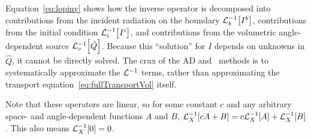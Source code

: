 Equation~\eqref{eq:lopinv} shows how the inverse operator is decomposed into
contributions from the incident radiation on the boundary
$\mathcal{L}_{b}^{-1}\!\left[I^b\right]$, contributions from the initial condition
$\mathcal{L}_{i}^{-1}\!\left[I^i\right]$, and contributions from the volumetric angle-dependent source
$\mathcal{L}_{v}^{-1}\!\left[\hat Q\right]$. Because this ``solution'' for $I$ depends on
unknowns in $\hat Q$, it cannot be directly solved. The crux of the AD and
\APone\ methods is to systematically approximate the $\mathcal L ^{-1}$ terms,
rather than approximating the transport equation~\eqref{eq:fullTransportVol}
itself.

Note that these operators are linear, so for some constant $c$ and any
arbitrary space- and angle-dependent functions $A$ and $B$, $\mathcal{L}_{X}^{-1}\!\left[ cA +
B\right] = c\mathcal{L}_{X}^{-1}\!\left[ A\right] + \mathcal{L}_{X}^{-1}\!\left[ B\right]$. This also means $\mathcal{L}_{X}^{-1}\!\left[0\right] = 0$.

